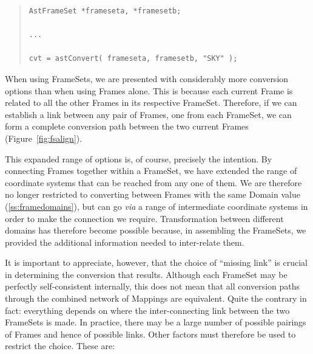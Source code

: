 \documentclass[twoside,11pt]{article}
\newcommand{\secref}[1]{\S\ref{#1}}
\renewcommand{\secref}[1]{\ref{#1}}
\begin{document}
\begin{quote}
\small
\begin{verbatim}
AstFrameSet *frameseta, *framesetb;

...

cvt = astConvert( frameseta, framesetb, "SKY" );
\end{verbatim}
\normalsize
\end{quote}

When using FrameSets, we are presented with considerably more
conversion options than when using Frames alone. This is because each
current Frame is related to all the other Frames in its respective
FrameSet. Therefore, if we can establish a link between any pair of
Frames, one from each FrameSet, we can form a complete conversion path
between the two current Frames (Figure~\ref{fig:fsalign}).

This expanded range of options is, of course, precisely the
intention. By connecting Frames together within a FrameSet, we have
extended the range of coordinate systems that can be reached from any
one of them.  We are therefore no longer restricted to converting
between Frames with the same Domain value (\secref{ss:framedomains}),
but can go {\em{via}} a range of intermediate coordinate systems in
order to make the connection we require. Transformation between
different domains has therefore become possible because, in assembling
the FrameSets, we provided the additional information needed to
inter-relate them.

It is important to appreciate, however, that the choice of ``missing
link'' is crucial in determining the conversion that results.
Although each FrameSet may be perfectly self-consistent internally,
this does not mean that all conversion paths through the combined
network of Mappings are equivalent. Quite the contrary in fact:
everything depends on where the inter-connecting link between the two
FrameSets is made.  In practice, there may be a large number of
possible pairings of Frames and hence of possible links. Other factors
must therefore be used to restrict the choice. These are:
\end{document}
